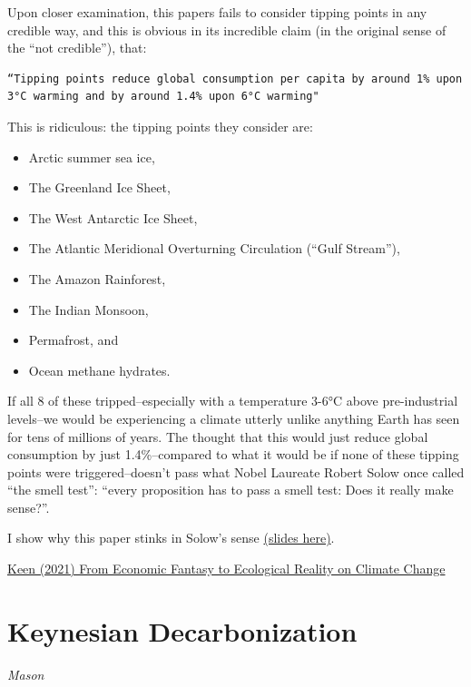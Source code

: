 \documentclass[
]{book}
\begin{document}
Upon closer examination, this papers fails to consider tipping points in any credible way, and this is obvious in its incredible claim (in the original sense of the ``not credible''), that:

\begin{verbatim}
“Tipping points reduce global consumption per capita by around 1% upon 3°C warming and by around 1.4% upon 6°C warming"
\end{verbatim}

This is ridiculous: the tipping points they consider are:

\begin{itemize}
\item
  Arctic summer sea ice,
\item
  The Greenland Ice Sheet,
\item
  The West Antarctic Ice Sheet,
\item
  The Atlantic Meridional Overturning Circulation (``Gulf Stream''),
\item
  The Amazon Rainforest,
\item
  The Indian Monsoon,
\item
  Permafrost, and
\item
  Ocean methane hydrates.
\end{itemize}

If all 8 of these tripped--especially with a temperature 3-6°C above pre-industrial levels--we would be experiencing a climate utterly unlike anything Earth has seen for tens of millions of years. The thought that this would just reduce global consumption by just 1.4\%--compared to what it would be if none of these tipping points were triggered--doesn't pass what Nobel Laureate Robert Solow once called ``the smell test'': ``every proposition has to pass a smell test: Does it really make sense?''.

I show why this paper stinks in Solow's sense \href{https://www.patreon.com/file?h=57752646\&i=9166994}{(slides here)}.

\href{https://www.patreon.com/posts/from-economic-to-57752646}{Keen (2021) From Economic Fantasy to Ecological Reality on Climate Change}

\hypertarget{keynesian-decarbonization}{%
\section{Keynesian Decarbonization}\label{keynesian-decarbonization}}

\emph{Mason}
\end{document}
